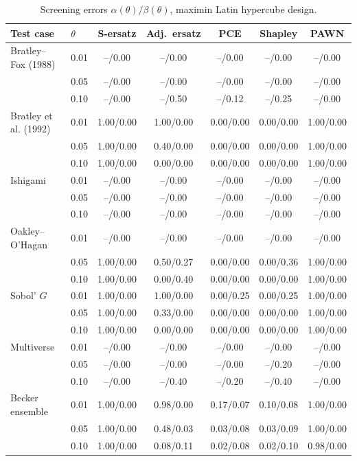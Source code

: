 \documentclass[11pt,a4paper]{article}
\begin{document}
\begin{table}[H]\centering\footnotesize
\begin{tabular}{@{}llccccc@{}}\toprule
Test case & $\theta$ & S-ersatz & Adj.\ ersatz & PCE & Shapley & PAWN \\ \midrule
Bratley--Fox (1988) & 0.01 & --/0.00 & --/0.00 & --/0.00 & --/0.00 & --/0.00 \\
 & 0.05 & --/0.00 & --/0.00 & --/0.00 & --/0.00 & --/0.00 \\
 & 0.10 & --/0.00 & --/0.50 & --/0.12 & --/0.25 & --/0.00 \\
\addlinespace[2pt]
Bratley et al. (1992) & 0.01 & 1.00/0.00 & 1.00/0.00 & 0.00/0.00 & 0.00/0.00 & 1.00/0.00 \\
 & 0.05 & 1.00/0.00 & 0.40/0.00 & 0.00/0.00 & 0.00/0.00 & 1.00/0.00 \\
 & 0.10 & 1.00/0.00 & 0.00/0.00 & 0.00/0.00 & 0.00/0.00 & 1.00/0.00 \\
\addlinespace[2pt]
Ishigami & 0.01 & --/0.00 & --/0.00 & --/0.00 & --/0.00 & --/0.00 \\
 & 0.05 & --/0.00 & --/0.00 & --/0.00 & --/0.00 & --/0.00 \\
 & 0.10 & --/0.00 & --/0.00 & --/0.00 & --/0.00 & --/0.00 \\
\addlinespace[2pt]
Oakley--O'Hagan & 0.01 & --/0.00 & --/0.00 & --/0.00 & --/0.00 & --/0.00 \\
 & 0.05 & 1.00/0.00 & 0.50/0.27 & 0.00/0.00 & 0.00/0.36 & 1.00/0.00 \\
 & 0.10 & 1.00/0.00 & 0.00/0.40 & 0.00/0.00 & 0.00/0.00 & 1.00/0.00 \\
\addlinespace[2pt]
Sobol' $G$ & 0.01 & 1.00/0.00 & 1.00/0.00 & 0.00/0.25 & 0.00/0.25 & 1.00/0.00 \\
 & 0.05 & 1.00/0.00 & 0.33/0.00 & 0.00/0.00 & 0.00/0.00 & 1.00/0.00 \\
 & 0.10 & 1.00/0.00 & 0.00/0.00 & 0.00/0.00 & 0.00/0.00 & 1.00/0.00 \\
\addlinespace[2pt]
Multiverse & 0.01 & --/0.00 & --/0.00 & --/0.00 & --/0.00 & --/0.00 \\
 & 0.05 & --/0.00 & --/0.00 & --/0.00 & --/0.20 & --/0.00 \\
 & 0.10 & --/0.00 & --/0.40 & --/0.20 & --/0.40 & --/0.00 \\
\addlinespace[2pt]
Becker ensemble & 0.01 & 1.00/0.00 & 0.98/0.00 & 0.17/0.07 & 0.10/0.08 & 1.00/0.00 \\
 & 0.05 & 1.00/0.00 & 0.48/0.03 & 0.03/0.08 & 0.03/0.09 & 1.00/0.00 \\
 & 0.10 & 1.00/0.00 & 0.08/0.11 & 0.02/0.08 & 0.02/0.10 & 0.98/0.00 \\
\bottomrule\end{tabular}
\caption{Screening errors $\alpha(\theta)/\beta(\theta)$, maximin Latin hypercube design.}
\label{tab:scr_lhs}
\end{table}
\end{document}
